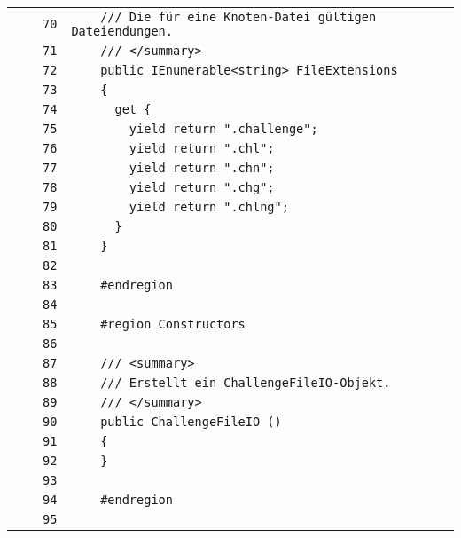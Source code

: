 \documentclass[a4paper,10pt]{article}
\begin{document}
\begin{longtable}[l]{lrrl}
\cellcolor{gray} &  & \verb~70~ & \verb~    /// Die für eine Knoten-Datei gültigen Dateiendungen.~\\
\cellcolor{gray} &  & \verb~71~ & \verb~    /// </summary>~\\
\cellcolor{gray} &  & \verb~72~ & \verb~    public IEnumerable<string> FileExtensions~\\
\cellcolor{gray} &  & \verb~73~ & \verb~    {~\\
\cellcolor{gray} &  & \verb~74~ & \verb~      get {~\\
\cellcolor{gray} &  & \verb~75~ & \verb~        yield return ".challenge";~\\
\cellcolor{gray} &  & \verb~76~ & \verb~        yield return ".chl";~\\
\cellcolor{gray} &  & \verb~77~ & \verb~        yield return ".chn";~\\
\cellcolor{gray} &  & \verb~78~ & \verb~        yield return ".chg";~\\
\cellcolor{gray} &  & \verb~79~ & \verb~        yield return ".chlng";~\\
\cellcolor{gray} &  & \verb~80~ & \verb~      }~\\
\cellcolor{gray} &  & \verb~81~ & \verb~    }~\\
\cellcolor{gray} &  & \verb~82~ & \verb~~\\
\cellcolor{gray} &  & \verb~83~ & \verb~    #endregion~\\
\cellcolor{gray} &  & \verb~84~ & \verb~~\\
\cellcolor{gray} &  & \verb~85~ & \verb~    #region Constructors~\\
\cellcolor{gray} &  & \verb~86~ & \verb~~\\
\cellcolor{gray} &  & \verb~87~ & \verb~    /// <summary>~\\
\cellcolor{gray} &  & \verb~88~ & \verb~    /// Erstellt ein ChallengeFileIO-Objekt.~\\
\cellcolor{gray} &  & \verb~89~ & \verb~    /// </summary>~\\
\cellcolor{gray} &  & \verb~90~ & \verb~    public ChallengeFileIO ()~\\
\cellcolor{gray} &  & \verb~91~ & \verb~    {~\\
\cellcolor{gray} &  & \verb~92~ & \verb~    }~\\
\cellcolor{gray} &  & \verb~93~ & \verb~~\\
\cellcolor{gray} &  & \verb~94~ & \verb~    #endregion~\\
\cellcolor{gray} &  & \verb~95~ & \verb~~\\

\end{longtable}
\end{document}
